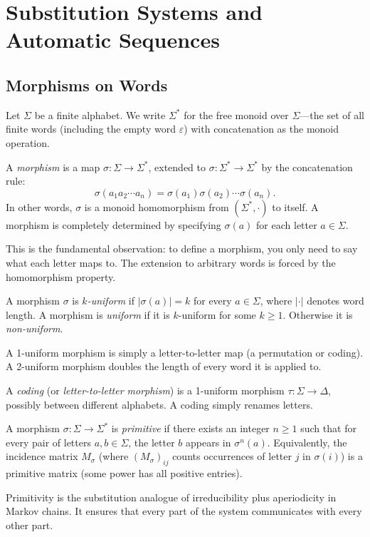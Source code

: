 \chapter{Substitution Systems and Automatic Sequences}

\section{Morphisms on Words}

Let $\Sigma$ be a finite alphabet. We write $\Sigma^*$ for the free monoid over $\Sigma$---the set of all finite words (including the empty word $\varepsilon$) with concatenation as the monoid operation.

\begin{definition}[Morphism]
A \textit{morphism} is a map $\sigma: \Sigma \to \Sigma^*$, extended to $\sigma: \Sigma^* \to \Sigma^*$ by the concatenation rule:
\[\sigma(a_1 a_2 \cdots a_n) = \sigma(a_1)\sigma(a_2)\cdots\sigma(a_n).\]
In other words, $\sigma$ is a monoid homomorphism from $(\Sigma^*, \cdot)$ to itself. A morphism is completely determined by specifying $\sigma(a)$ for each letter $a \in \Sigma$.

This is the fundamental observation: to define a morphism, you only need to say what each letter maps to. The extension to arbitrary words is forced by the homomorphism property.
\end{definition}

\begin{definition}
A morphism $\sigma$ is \textit{$k$-uniform} if $|\sigma(a)| = k$ for every $a \in \Sigma$, where $|\cdot|$ denotes word length. A morphism is \textit{uniform} if it is $k$-uniform for some $k \geq 1$. Otherwise it is \textit{non-uniform}.

A 1-uniform morphism is simply a letter-to-letter map (a permutation or coding). A 2-uniform morphism doubles the length of every word it is applied to.
\end{definition}

\begin{definition}[Coding]
A \textit{coding} (or \textit{letter-to-letter morphism}) is a 1-uniform morphism $\tau: \Sigma \to \Delta$, possibly between different alphabets. A coding simply renames letters.
\end{definition}

\begin{definition}
A morphism $\sigma: \Sigma \to \Sigma^*$ is \textit{primitive} if there exists an integer $n \geq 1$ such that for every pair of letters $a, b \in \Sigma$, the letter $b$ appears in $\sigma^n(a)$. Equivalently, the incidence matrix $M_\sigma$ (where $(M_\sigma)_{ij}$ counts occurrences of letter $j$ in $\sigma(i)$) is a primitive matrix (some power has all positive entries).

Primitivity is the substitution analogue of irreducibility plus aperiodicity in Markov chains. It ensures that every part of the system communicates with every other part.
\end{definition}



